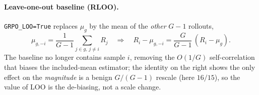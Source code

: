 \documentclass[11pt]{article}
\newcommand{\cd}[1]{\texttt{#1}}
\begin{document}
\paragraph{Leave-one-out baseline (RLOO).} \cd{GRPO\_LOO=True} replaces $\mu_g$ by the mean of the
\emph{other} $G-1$ rollouts,
\begin{equation}
\mu_{g,-i}=\frac1{G-1}\sum_{j\in g,\,j\neq i}R_j
\quad\Longrightarrow\quad
R_i-\mu_{g,-i}=\frac{G}{G-1}\,(R_i-\mu_g).
\label{eq:loo}
\end{equation}
The baseline no longer contains sample $i$, removing the $O(1/G)$ self-correlation that biases the
included-mean estimator; the identity on the right shows the only effect on the \emph{magnitude} is a
benign $G/(G\!-\!1)$ rescale (here $16/15$), so the value of LOO is the de-biasing, not a scale change.

\end{document}
